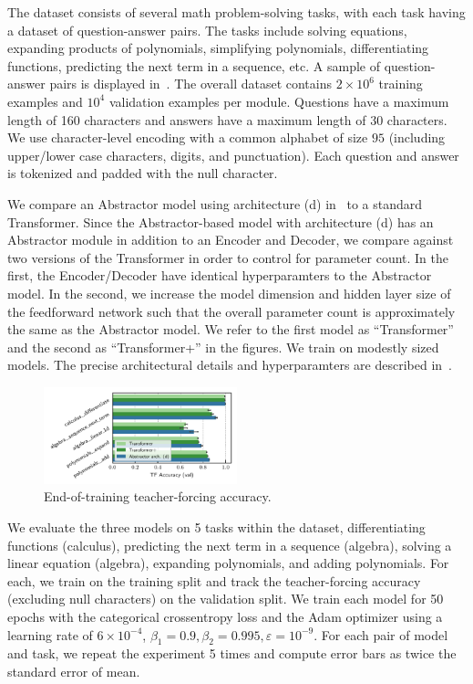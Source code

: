 The dataset consists of several math problem-solving tasks, with each task having a dataset of question-answer pairs. The tasks include solving equations, expanding products of polynomials, simplifying polynomials, differentiating functions, predicting the next term in a sequence, etc. A sample of question-answer pairs is displayed in~. The overall dataset contains $2 \times 10^6$ training examples and $10^4$ validation examples per module. Questions have a maximum length of 160 characters and answers have a maximum length of 30 characters. We use character-level encoding with a common alphabet of size $95$ (including upper/lower case characters, digits, and punctuation). Each question and answer is tokenized and padded with the null character.

We compare an Abstractor model using architecture (d) in~ to a standard Transformer. Since the Abstractor-based model with architecture (d) has an Abstractor module in addition to an Encoder and Decoder, we compare against two versions of the Transformer in order to control for parameter count. In the first, the Encoder/Decoder have identical hyperparamters to the Abstractor model. In the second, we increase the model dimension and hidden layer size of the feedforward network such that the overall parameter count is approximately the same as the Abstractor model. We refer to the first model as ``Transformer'' and the second as ``Transformer+'' in the figures. We train on modestly sized models. The precise architectural details and hyperparamters are described in~.

\begin{figure}
    \centering
    \includegraphics[width=0.5\textwidth]{figures/experiments/math_metrics.pdf}
    \caption{\footnotesize End-of-training teacher-forcing accuracy.}\label{fig:math_metrics}
\end{figure}

We evaluate the three models on 5 tasks within the dataset, differentiating functions (calculus), predicting the next term in a sequence (algebra), solving a linear equation (algebra), expanding polynomials, and adding polynomials. For each, we train on the training split and track the teacher-forcing accuracy (excluding null characters) on the validation split. We train each model for 50 epochs with the categorical crossentropy loss and the Adam optimizer using a learning rate of $6 \times 10^{-4}$, $\beta_1 = 0.9, \beta_2 = 0.995, \varepsilon = 10^{-9}$. For each pair of model and task, we repeat the experiment 5 times and compute error bars as twice the standard error of mean.

